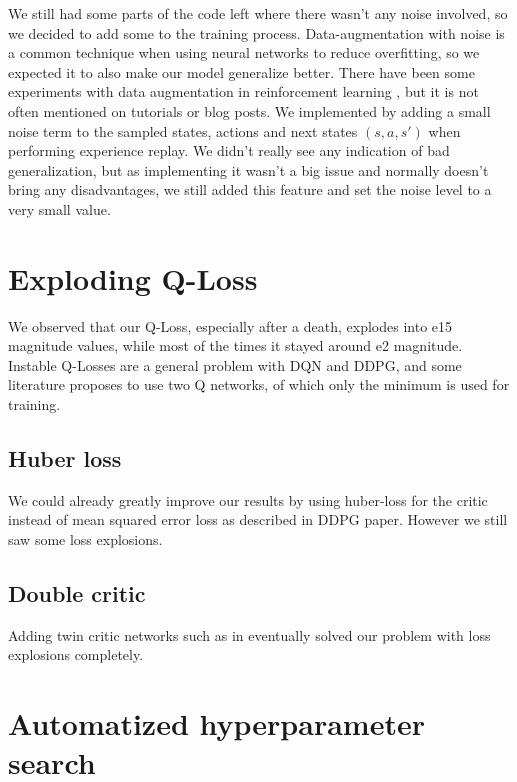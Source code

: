 \documentclass[hyperref,german,beleg]{cgvpub}
\begin{document}
We still had some parts of the code left where there wasn't any noise involved, so we decided to add some to the training process. Data-augmentation with noise is a common technique when using neural networks \cite[p.347]{bishopNeuralNetworksPattern1995} to reduce overfitting, so we expected it to also make our model generalize better. There have been some experiments with data augmentation in reinforcement learning \cite{cobbeQuantifyingGeneralizationReinforcement2019}, but it is not often mentioned on tutorials or blog posts. We implemented by adding a small noise term to the sampled states, actions and next states \((s, a, s')\) when performing experience replay. We didn't really see any indication of bad generalization, but as implementing it wasn't a big issue and normally doesn't bring any disadvantages, we still added this feature and set the noise level to a very small value.

\section{Exploding Q-Loss}

We observed that our Q-Loss, especially after a death, explodes into e15 magnitude values, while most of the times it stayed around e2 magnitude. Instable Q-Losses are a general problem with DQN and DDPG, and some literature \cite{fujimotoAddressingFunctionApproximation2018} proposes to use two Q networks, of which only the minimum is used for training. 

\subsection{Huber loss}
We could already greatly improve our results by using huber-loss \cite{huber1964} for the critic instead of mean squared error loss as described in DDPG paper. However we still saw some loss explosions.

\subsection{Double critic}
Adding twin critic networks such as in \cite{fujimotoAddressingFunctionApproximation2018} eventually solved our problem with loss explosions completely.

\section{Automatized hyperparameter search}
\end{document}
